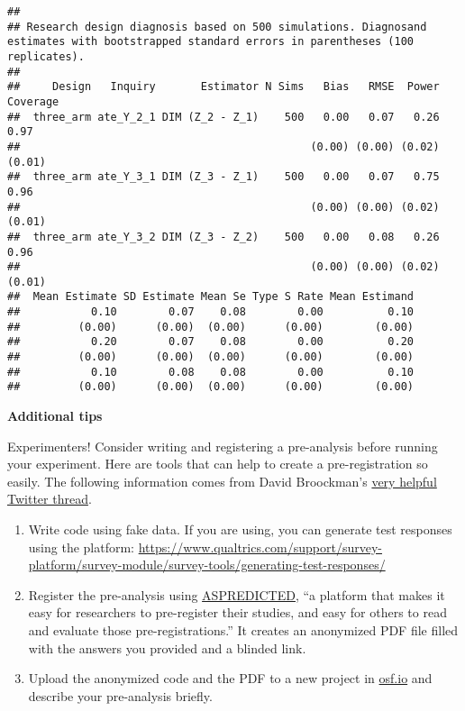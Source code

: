 \documentclass[
]{book}
\begin{document}
\begin{verbatim}
## 
## Research design diagnosis based on 500 simulations. Diagnosand estimates with bootstrapped standard errors in parentheses (100 replicates).
## 
##     Design   Inquiry       Estimator N Sims   Bias   RMSE  Power Coverage
##  three_arm ate_Y_2_1 DIM (Z_2 - Z_1)    500   0.00   0.07   0.26     0.97
##                                             (0.00) (0.00) (0.02)   (0.01)
##  three_arm ate_Y_3_1 DIM (Z_3 - Z_1)    500   0.00   0.07   0.75     0.96
##                                             (0.00) (0.00) (0.02)   (0.01)
##  three_arm ate_Y_3_2 DIM (Z_3 - Z_2)    500   0.00   0.08   0.26     0.96
##                                             (0.00) (0.00) (0.02)   (0.01)
##  Mean Estimate SD Estimate Mean Se Type S Rate Mean Estimand
##           0.10        0.07    0.08        0.00          0.10
##         (0.00)      (0.00)  (0.00)      (0.00)        (0.00)
##           0.20        0.07    0.08        0.00          0.20
##         (0.00)      (0.00)  (0.00)      (0.00)        (0.00)
##           0.10        0.08    0.08        0.00          0.10
##         (0.00)      (0.00)  (0.00)      (0.00)        (0.00)
\end{verbatim}

\textbf{Additional tips}

Experimenters! Consider writing and registering a pre-analysis before running your experiment. Here are tools that can help to create a pre-registration so easily. The following information comes from David Broockman's \href{https://twitter.com/dbroockman/status/1350897814499336192}{very helpful Twitter thread}.

\begin{enumerate}
\def\labelenumi{\arabic{enumi}.}
\item
  Write code using fake data. If you are using, you can generate test responses using the platform: \url{https://www.qualtrics.com/support/survey-platform/survey-module/survey-tools/generating-test-responses/}
\item
  Register the pre-analysis using \href{https://aspredicted.org/}{ASPREDICTED}, ``a platform that makes it easy for researchers to pre-register their studies, and easy for others to read and evaluate those pre-registrations.'' It creates an anonymized PDF file filled with the answers you provided and a blinded link.
\item
  Upload the anonymized code and the PDF to a new project in \href{https://osf.io/}{osf.io} and describe your pre-analysis briefly.
\end{enumerate}
\end{document}
